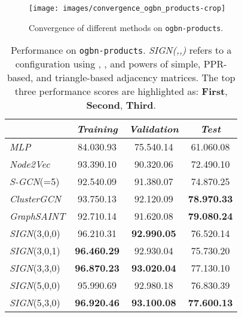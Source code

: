 \documentclass{article}
\begin{document}
\begin{figure}
    \centering
    \texttt{[image: images/convergence\_ogbn\_products-crop]}
    \caption{Convergence of different methods on \texttt{ogbn-products}.}
    \label{fig:ogb_timings}
\end{figure}

\begin{table}[t]
    \centering
    \caption{Performance on \texttt{ogbn-products}. {\em SIGN(,,)} refers to a configuration using , , and  powers of simple, PPR-based, and triangle-based adjacency matrices. The top three performance scores are highlighted as: {\bf \color{red} First}, {\bf \color{violet} Second}, {\bf Third}.}
    \label{tab:results_ogb}
    \begin{tabular}{| l | ccc |}
        \hline
        & \textit{Training} & \textit{Validation} & \textit{Test} \\
        \hline
        \textit{MLP} & 84.030.93 & 75.540.14 & 61.060.08 \\
        \textit{Node2Vec} & 93.390.10 & 90.320.06 & 72.490.10 \\
        \textit{S-GCN}(=5) & 92.540.09 & 91.380.07 & 74.870.25 \\
        \hline
\textit{ClusterGCN} & 93.750.13 & 92.120.09 & {\bf \color{violet} 78.970.33} \\ 
        \textit{GraphSAINT} & 92.710.14 & 91.620.08 & {\bf \color{red} 79.080.24} \\ 
        \hline
        \textit{SIGN}(3,0,0) & 96.210.31 & {\bf 92.990.05} & 76.520.14 \\
        \textit{SIGN}(3,0,1) & {\bf 96.460.29} & 92.930.04 & 75.730.20 \\
        \textit{SIGN}(3,3,0) & {\bf \color{violet} 96.870.23} & {\bf \color{violet} 93.020.04} & 77.130.10 \\
        \textit{SIGN}(5,0,0) & 95.990.69 & 92.980.18 & 76.830.39 \\
        \textit{SIGN}(5,3,0) & {\bf \color{red} 96.920.46} & {\bf \color{red} 93.100.08} & {\bf  77.600.13}\\
        \hline
    \end{tabular}
\end{table}
\end{document}
